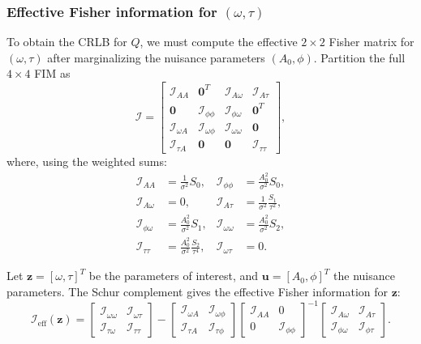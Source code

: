 \documentclass[11pt]{article}
\begin{document}
\subsubsection{Effective Fisher information for $(\omega, \tau)$}

To obtain the CRLB for $Q$, we must compute the effective $2\times2$ Fisher matrix for $(\omega, \tau)$ after marginalizing the nuisance parameters $(A_0, \phi)$. Partition the full $4\times4$ FIM as
\[
\mathcal{I} = 
\begin{bmatrix}
\mathcal{I}_{AA} & \mathbf{0}^T & \mathcal{I}_{A\omega} & \mathcal{I}_{A\tau} \\
\mathbf{0} & \mathcal{I}_{\phi\phi} & \mathcal{I}_{\phi\omega} & \mathbf{0}^T \\
\mathcal{I}_{\omega A} & \mathcal{I}_{\omega\phi} & \mathcal{I}_{\omega\omega} & \mathbf{0} \\
\mathcal{I}_{\tau A} & \mathbf{0} & \mathbf{0} & \mathcal{I}_{\tau\tau}
\end{bmatrix},
\]
where, using the weighted sums:
\begin{align}
\mathcal{I}_{AA} &= \frac{1}{\sigma^2} S_0, &
\mathcal{I}_{\phi\phi} &= \frac{A_0^2}{\sigma^2} S_0, \\
\mathcal{I}_{A\omega} &= 0, &
\mathcal{I}_{A\tau} &= \frac{1}{\sigma^2} \frac{S_1}{\tau^2}, \\
\mathcal{I}_{\phi\omega} &= \frac{A_0^2}{\sigma^2} S_1, &
\mathcal{I}_{\omega\omega} &= \frac{A_0^2}{\sigma^2} S_2, \\
\mathcal{I}_{\tau\tau} &= \frac{A_0^2}{\sigma^2} \frac{S_2}{\tau^4}, &
\mathcal{I}_{\omega\tau} &= 0.
\end{align}

Let $\mathbf{z} = [\omega, \tau]^T$ be the parameters of interest, and $\mathbf{u} = [A_0, \phi]^T$ the nuisance parameters. The Schur complement gives the effective Fisher information for $\mathbf{z}$:
\[
\mathcal{I}_{\text{eff}}(\mathbf{z}) = 
\begin{bmatrix}
\mathcal{I}_{\omega\omega} & \mathcal{I}_{\omega\tau} \\
\mathcal{I}_{\tau\omega} & \mathcal{I}_{\tau\tau}
\end{bmatrix}
-
\begin{bmatrix}
\mathcal{I}_{\omega A} & \mathcal{I}_{\omega\phi}  \\
\mathcal{I}_{\tau A} & \mathcal{I}_{\tau\phi}
\end{bmatrix}
\begin{bmatrix}
\mathcal{I}_{AA} & 0 \\
0 & \mathcal{I}_{\phi\phi}
\end{bmatrix}^{-1}
\begin{bmatrix}
\mathcal{I}_{A\omega} & \mathcal{I}_{A\tau} \\
\mathcal{I}_{\phi\omega} & \mathcal{I}_{\phi\tau}
\end{bmatrix}.
\]
\end{document}

